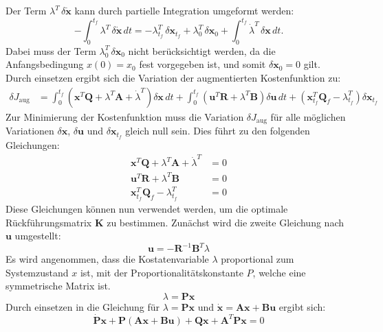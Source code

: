 Der Term $\lambda^{T}\,\delta \dot{\mathbf{x}}$ kann durch partielle Integration umgeformt werden:
\begin{equation}
- \int_{0}^{t_f} \lambda^{T}\,\delta \dot{\mathbf{x}}\, dt
=
- \lambda^{T}_{t_f}\,\delta \mathbf{x}_{t_f}
+ \lambda^{T}_{0}\,\delta \mathbf{x}_{0}
+ \int_{0}^{t_f} \dot{\lambda}^{T}\,\delta \mathbf{x}\, dt .
\end{equation}
Dabei muss der Term $\lambda^{T}_{0}\,\delta \mathbf{x}_{0}$ nicht berücksichtigt werden, da die Anfangsbedingung $x(0)=x_0$ fest vorgegeben ist, und somit $\delta \mathbf{x}_{0} = 0$ gilt.
\\
Durch einsetzen ergibt sich die Variation der augmentierten Kostenfunktion zu:
\begin{align}
\delta J_{\text{aug}} &=
\int_{0}^{t_f}
\left(\mathbf{x}^{T}\mathbf{Q} + \lambda^{T}\mathbf{A} + \dot{\lambda}^{T}\right)\delta \mathbf{x}\, dt
+
\int_{0}^{t_f}
\left(\mathbf{u}^{T}\mathbf{R} + \lambda^{T}\mathbf{B}\right)\delta \mathbf{u}\, dt  
+
\left(\mathbf{x}_{t_f}^{T}\mathbf{Q}_f - \lambda^{T}_{t_f}\right)\delta \mathbf{x}_{t_f}
\end{align}
Zur Minimierung der Kostenfunktion muss die Variation $\delta J_{\text{aug}}$ für alle möglichen Variationen $\delta \mathbf{x}$, $\delta \mathbf{u}$ und $\delta \mathbf{x}_{t_f}$ gleich null sein. Dies führt zu den folgenden Gleichungen:
\begin{align}
\mathbf{x}^{T}\mathbf{Q} + \lambda^{T}\mathbf{A} + \dot{\lambda}^{T} &= 0  \\
\mathbf{u}^{T}\mathbf{R} + \lambda^{T}\mathbf{B} &= 0  \\
\mathbf{x}_{t_f}^{T}\mathbf{Q}_f - \lambda^{T}_{t_f} &= 0
\end{align}
Diese Gleichungen können nun verwendet werden, um die optimale Rückführungsmatrix $\mathbf{K}$ zu bestimmen. Zunächst wird die zweite Gleichung nach $\mathbf{u}$ umgestellt:
\begin{equation}
\mathbf{u} = \mathbf{-R}^{-1}\mathbf{B}^{T}\lambda 
\end{equation}
Es wird angenommen, dass die Kostatenvariable $\lambda$ proportional zum Systemzustand $x$ ist, mit der Proportionalitätskonstante $P$, welche eine symmetrische Matrix ist. 
\begin{equation}
\lambda = \mathbf{Px}
\end{equation}
Durch einsetzen in die Gleichung für $\lambda = \mathbf{Px}$ und $\dot{\mathbf{x}} = \mathbf{Ax} + \mathbf{Bu}$ ergibt sich:
\begin{equation}
\dot{\mathbf{P}}\mathbf{x} + \mathbf{P}(\mathbf{Ax} + \mathbf{Bu}) + \mathbf{Q}\mathbf{x} + \mathbf{A}^{T}\mathbf{Px} = 0 
\end{equation}

